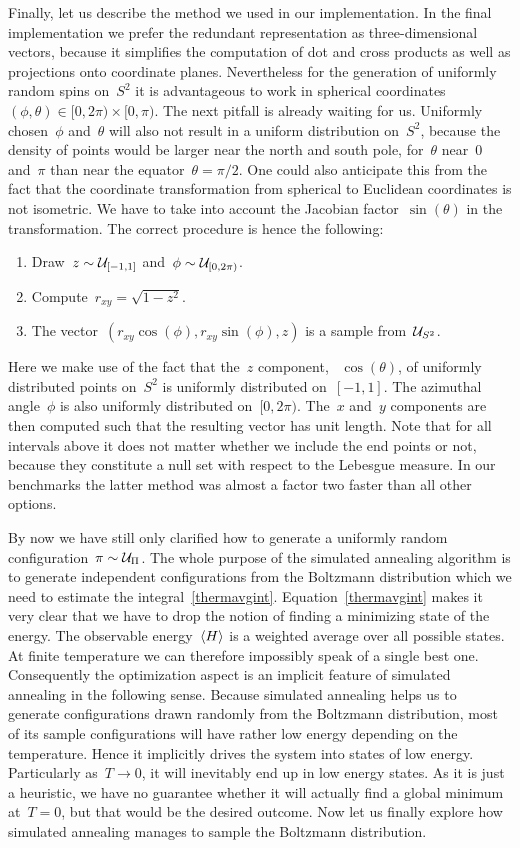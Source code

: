 Finally, let us describe the method we used in our implementation. In the final
implementation we prefer the redundant representation as three-dimensional
vectors, because it simplifies the computation of dot and cross products as well
as projections onto coordinate planes. Nevertheless for the generation of
uniformly random spins on~$S^2$ it is advantageous to work in spherical
coordinates~$(\phi, \theta) \in [0,2\pi) \times [0,\pi)$. The next pitfall is
already waiting for us. Uniformly chosen~$\phi$ and~$\theta$ will also not
result in a uniform distribution on~$S^2$, because the density of points would
be larger near the north and south pole, \ie{} for~$\theta$ near~$0$ and~$\pi$
than near the equator~$\theta=\pi/2$. One could also anticipate this from the
fact that the coordinate transformation from spherical to Euclidean coordinates
is not isometric. We have to take into account the Jacobian
factor~$\sin(\theta)$ in the transformation. The correct procedure is hence the
following:
%
\begin{enumerate}
  \item Draw~$z \sim \mathcal{U}_{[-1,1]}$ and~$\phi \sim \mathcal{U}_{[0,2\pi)}$.
  \item Compute~$r_{xy} = \sqrt{1 - z^2}$.
  \item The vector~$(r_{xy} \cos(\phi), r_{xy} \sin(\phi), z)$ is a sample
    from~$\mathcal{U}_{S^2}$.
\end{enumerate}
%
Here we make use of the fact that the~$z$ component, \ie{}~$\cos(\theta)$, of
uniformly distributed points on~$S^2$ is uniformly distributed on~$[-1,1]$. The
azimuthal angle~$\phi$ is also uniformly distributed on~$[0,2\pi)$. The~$x$
and~$y$ components are then computed such that the resulting vector has unit
length. Note that for all intervals above it does not matter whether we include
the end points or not, because they constitute a null set with respect to the
Lebesgue measure. In our benchmarks the latter method was almost a factor two
faster than all other options.

By now we have still only clarified how to generate a uniformly random
configuration~$\pi \sim \mathcal{U}_{\Pi}$. The whole purpose of the simulated annealing
algorithm is to generate independent configurations from the Boltzmann
distribution which we need to estimate the integral~\eqref{thermavgint}.
Equation~\eqref{thermavgint} makes it very clear that we have to drop the notion
of finding a minimizing state of the energy. The observable energy~$\langle H \rangle$ is
a weighted average over all possible states. At finite temperature we can
therefore impossibly speak of a single best one. Consequently the optimization
aspect is an implicit feature of simulated annealing in the following sense.
Because simulated annealing helps us to generate configurations drawn randomly
from the Boltzmann distribution, most of its sample configurations will have
rather low energy depending on the temperature. Hence it implicitly drives the
system into states of low energy. Particularly as~$T \to 0$, it will inevitably
end up in low energy states. As it is just a heuristic, we have no guarantee
whether it will actually find a global minimum at~$T=0$, but that would be the
desired outcome. Now let us finally explore how simulated annealing manages to
sample the Boltzmann distribution.

